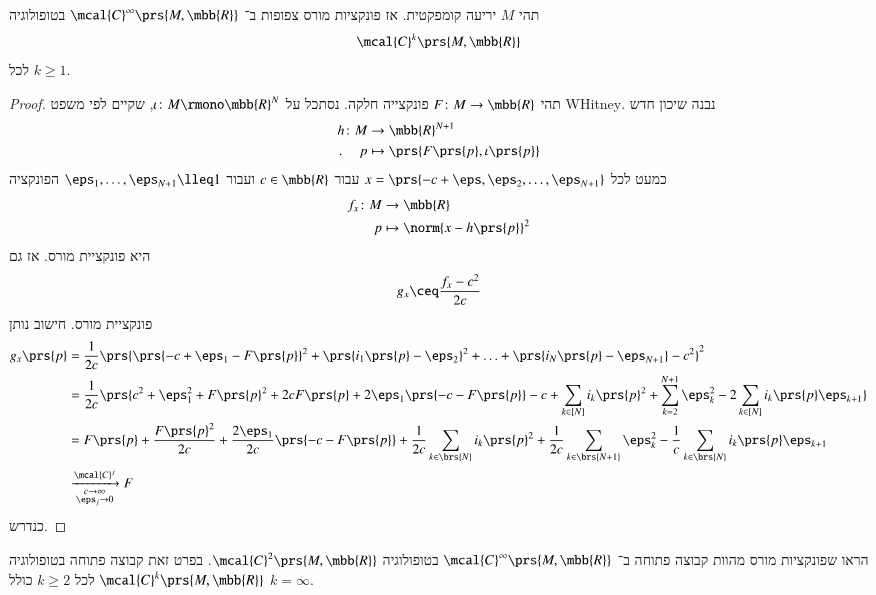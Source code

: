 \documentclass[a4paper,10pt,twoside,openany]{book}
\begin{document}
\begin{theorem}
תהי
$M$
יריעה קומפקטית. אז פונקציות מורס צפופות ב־%
$\mcal{C}^\infty\prs{M, \mbb{R}}$
בטופולוגיה
\[\mcal{C}^k\prs{M,\mbb{R}}\]
לכל
$k \geq 1$.
\end{theorem}

\begin{proof}
תהי
$F \colon M \to \mbb{R}$
פונקצייה חלקה.
נסתכל על
$\iota \colon M \rmono \mbb{R}^N$,
שקיים לפי משפט
\textenglish{WHitney}.
נבנה שיכון חדש
\begin{align*}
h \colon M &\to \mbb{R}^{N+1} \\
\text{.} \hphantom{h \colon} p&\mapsto \prs{F\prs{p}, \iota\prs{p}}
\end{align*}
כמעט לכל
$x = \prs{-c+\eps,\eps_2, \ldots, \eps_{N+1}}$
עבור
$c \in \mbb{R}$
ועבור
$\eps_1, \ldots, \eps_{N+1} \lleq 1$
הפונקציה
\begin{align*}
f_x \colon M &\to \mbb{R} \\
p &\mapsto \norm{x-h\prs{p}}^2
\end{align*}
היא פונקציית מורס.
אז גם
\begin{align*}
g_x \ceq \frac{f_x - c^2}{2c}
\end{align*}
פונקציית מורס.
חישוב נותן
\begin{align*}
g_x\prs{p} &= \frac{1}{2c} \prs{\prs{-c + \eps_1 - F\prs{p}}^2 + \prs{i_1\prs{p} - \eps_2}^2 + \ldots + \prs{i_N\prs{p} - \eps_{N+1}} - c^2}^2
\\&= \frac{1}{2c} \prs{c^2 + \eps_1^2 + F\prs{p}^2 + 2c F\prs{p} + 2 \eps_1\prs{-c-F\prs{p}} - c + \sum_{k \in [N]} i_k\prs{p}^2 + \sum_{k = 2}^{N+1} \eps_k^2 - 2 \sum_{k \in [N]} i_k\prs{p} \eps_{k+1}}
\\&= F\prs{p} + \frac{F\prs{p}^2}{2c} + \frac{2 \eps_1}{2c} \prs{-c - F\prs{p}} + \frac{1}{2c} \sum_{k \in \brs{N}} i_k\prs{p}^2 + \frac{1}{2c} \sum_{k \in \brs{N+1}} \eps_k^2 - \frac{1}{c} \sum_{k \in \brs{N}} i_k\prs{p} \eps_{k+1}
\\&\xrightarrow[\substack{c \to \infty \\ \eps_j \to 0}]{\mcal{C}^j} F
\end{align*}
כנדרש.
\end{proof}

\begin{exercise}
הראו שפונקציות מורס מהוות קבוצה פתוחה ב־%
$\mcal{C}^\infty\prs{M,\mbb{R}}$
בטופולוגיה
$\mcal{C}^2\prs{M,\mbb{R}}$.
בפרט זאת קבוצה פתוחה בטופולוגיה
$\mcal{C}^k\prs{M,\mbb{R}}$
לכל
$k \geq 2$
כולל
$k = \infty$.
\end{exercise}
\end{document}
